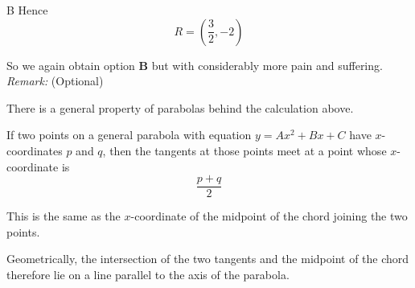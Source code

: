\documentclass[11pt,a4paper]{article}
\begin{document}
\begin{enumerate}[label=\textbf{\arabic*.},leftmargin=*,itemsep=0pt,start=8]
\begin{djsSolution}{B}
Hence
\[
R=\left(\frac32,-2\right)
\]

So we again obtain option \textbf{B} but with considerably more pain and suffering. \\[5pt]

\textit{Remark:} (Optional)

There is a general property of parabolas behind the calculation above. 

If two points on a general parabola with equation $y=Ax^2+Bx+C$ have $x$-coordinates $p$ and $q$, then the tangents at those points meet at a point whose $x$-coordinate is
\[
\frac{p+q}{2}
\]

This is the same as the $x$-coordinate of the midpoint of the chord joining the two points. 

Geometrically, the intersection of the two tangents and the midpoint of the chord therefore lie on a line parallel to the axis of the parabola.
\end{djsSolution}
\end{enumerate}
\clearpage
\thispagestyle{djssolutions}
\vspace*{8pt}
\end{document}
